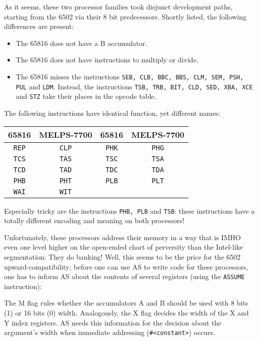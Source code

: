 \documentclass[12pt,twoside]{report}
\newcommand{\tty}[1]{{\tt #1}}
\newcommand{\asname}{{AS}}
\begin{document}
As it seems, these two processor families took disjunct development
paths, starting from the 6502 via their 8 bit predecessors.  Shortly
listed, the following differences are present:
\begin{itemize}
\item{The 65816 does not have a B accumulator.}
\item{The 65816 does not have instructions to multiply or divide.}
\item{The 65816 misses the instructions \tty{SEB, CLB, BBC, BBS, CLM, SEM,
      PSH, PUL} and \tty{LDM}.  Instead, the instructions \tty{TSB, TRB, BIT, CLD,
      SED, XBA, XCE} and \tty{STZ} take their places in the opcode table.}
\end{itemize}
The following instructions have identical function, yet different
names:
\par
\begin{center}\begin{tabular}{|c|c||c|c|}
\hline
   65816  &  MELPS-7700 & 65816 &  MELPS-7700 \\
\hline
\hline
    \tty{REP}  &  \tty{CLP}  &  \tty{PHK}  &  \tty{PHG} \\
    \tty{TCS}  &  \tty{TAS}  &  \tty{TSC}  &  \tty{TSA} \\
    \tty{TCD}  &  \tty{TAD}  &  \tty{TDC}  &  \tty{TDA} \\
    \tty{PHB}  &  \tty{PHT}  &  \tty{PLB}  &  \tty{PLT} \\
    \tty{WAI}  &  \tty{WIT}  &             & \\
\hline
\end{tabular}\end{center}
\par
Especially tricky are the instructions \tty{PHB, PLB} and \tty{TSB}: these
instructions have a totally different encoding and meaning on both
processors!

Unfortunately, these processors address their memory in a way that is
IMHO even one level higher on the open-ended chart of perversity than
the Intel-like segmentation: They do banking!  Well, this seems to
be the price for the 6502 upward-compatibility; before one can use \asname{}
to write code for these processors, one has to inform \asname{} about the
contents of several registers (using the \tty{ASSUME} instruction):

The M flag rules whether the accumulators A and B should be used with
8 bits (1) or 16 bits (0) width.  Analogously, the X flag decides the
width of the X and Y index registers.  \asname{} needs this information for
the decision about the argument's width when immediate addressing
(\verb!#<constant>!) occurs.
\end{document}
